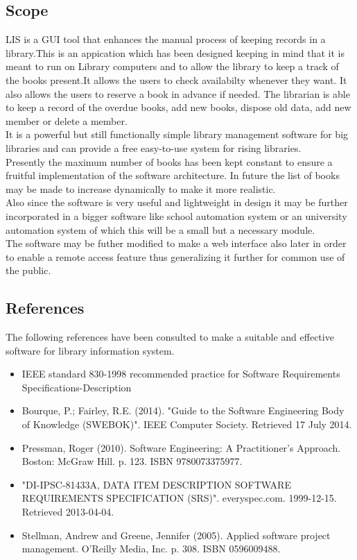 \documentclass{article}
\begin{document}
\subsection{Scope}
LIS is a GUI tool that enhances the manual process of keeping records in a library.This is an appication which has been designed keeping in mind that it is meant to run on Library computers and to allow the library to keep a track of the books present.It allows the users to check availabilty whenever they want. It also allows the users to reserve a book in advance if needed. The librarian is able to keep a record of the overdue books, add new books, dispose old data, add new member or delete a member. 
\\
It is a powerful but still functionally simple library management software for big libraries and can provide a free easy-to-use system for rising libraries.
\\
Presently the maximum number of books has been kept constant to ensure a fruitful implementation of the software architecture. In future the list of books may be made to increase dynamically to make it more realistic.
\\
Also since the software is very useful and lightweight in design it may be further incorporated in a bigger software like school automation system or an university automation system of which this will be a small but a necessary module.
\\
The software may be futher modified to make a web interface also later in order to enable a remote access feature thus generalizing it further for common use of the public.
\subsection{References}
The following references have been consulted to make a suitable and effective software for library information system.

\begin{itemize}
\item IEEE standard 830-1998 recommended practice for Software Requirements Specifications-Description
\item Bourque, P.; Fairley, R.E. (2014). "Guide to the Software Engineering Body of Knowledge (SWEBOK)". IEEE Computer Society. Retrieved 17 July 2014.
\item Pressman, Roger (2010). Software Engineering: A Practitioner's Approach. Boston: McGraw Hill. p. 123. ISBN 9780073375977.
\item "DI-IPSC-81433A, DATA ITEM DESCRIPTION SOFTWARE REQUIREMENTS SPECIFICATION (SRS)". everyspec.com. 1999-12-15. Retrieved 2013-04-04.
\item Stellman, Andrew and Greene, Jennifer (2005). Applied software project management. O'Reilly Media, Inc. p. 308. ISBN 0596009488.
\end{itemize}
\end{document}
